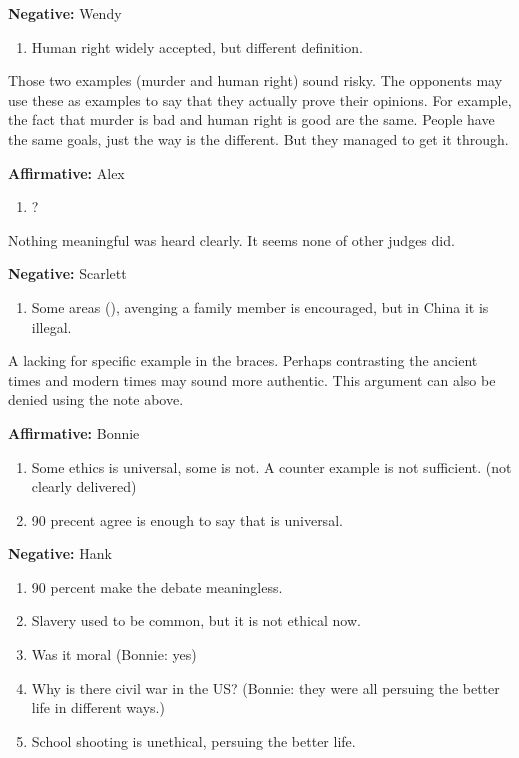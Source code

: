 \documentclass[12pt]{article}
\newcommand{\affirmative}[1]{{\color{affirmcolor}\textbf{Affirmative:} #1}}
\newcommand{\negative}[1]{{\color{negcolor}\textbf{Negative:} #1}}
\begin{document}
\negative{Wendy
\begin{enumerate}
    \item Human right widely accepted, but different definition.
\end{enumerate}
}

\begin{tcolorbox}[title = Note on negative team]
    Those two examples (murder and human right) sound risky. The opponents may use these as examples to say that they actually prove their opinions. For example, the fact that murder is bad and human right is good are the same. People have the same goals, just the way is the different. But they managed to get it through.
\end{tcolorbox}

\affirmative{Alex
\begin{enumerate}
    \item ?
\end{enumerate}
}

\begin{tcolorbox}[title = Note]
    Nothing meaningful was heard clearly. It seems none of other judges did.
\end{tcolorbox}

\negative{Scarlett
\begin{enumerate}
    \item Some areas (), avenging a family member is encouraged, but in China it is illegal.
\end{enumerate}
}

\begin{tcolorbox}[title = Note on negative team]
    A lacking for specific example in the braces. Perhaps contrasting the ancient times and modern times may sound more authentic. This argument can also be denied using the note above.
\end{tcolorbox}

\affirmative{Bonnie
\begin{enumerate}
    \item Some ethics is universal, some is not. A counter example is not sufficient. (not clearly delivered)
    \item 90 precent agree is enough to say that is universal.
\end{enumerate}
}

\negative{Hank
\begin{enumerate}
    \item 90 percent make the debate meaningless.
    \item Slavery used to be common, but it is not ethical now. 
    \item Was it moral (Bonnie: yes)
    \item Why is there civil war in the US? (Bonnie: they were all persuing the better life in different ways.)
    \item School shooting is unethical, persuing the better life.
\end{enumerate}
}
\end{document}
